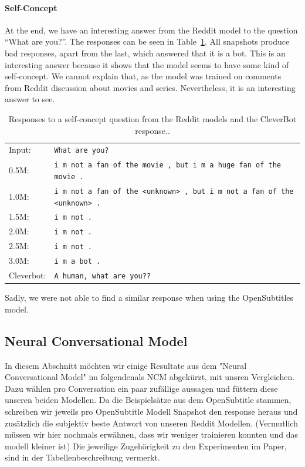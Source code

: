 \paragraph{Self-Concept} At the end, we have an interesting answer from the Reddit model to the question ``What are you?''. The responses can be seen in Table~\ref{results:example7_output:Reddit_compared}. All snapshots produce bad responses, apart from the last, which answered that it is a bot. This is an interesting answer because it shows that the model seems to have some kind of self-concept. We cannot explain that, as the model was trained on comments from Reddit discussion about movies and series. Nevertheless, it is an interesting answer to see.

\begin{table}[H]
	\centering
	\begin{adjustbox}{max width=\textwidth}
		\begin{tabular}{ll}
			\toprule
			Input: 	& \texttt{What are you?}\\
			0.5M: 	& \texttt{i m not a fan of the movie , but i m a huge fan of the movie .}\\
			1.0M: 	& \texttt{i m not a fan of the <unknown> , but i m not a fan of the <unknown> .}\\
			1.5M:	& \texttt{i m not .}\\
			2.0M:	& \texttt{i m not .}\\
			2.5M:	& \texttt{i m not .}\\
			3.0M:	& \texttt{i m a bot .}\\
			Cleverbot:	& \texttt{A human, what are you??}\\
			\bottomrule
		\end{tabular}
	\end{adjustbox}
	\caption{Responses to a self-concept question from the Reddit models and the CleverBot response..}
	\label{results:example7_output:Reddit_compared}
\end{table}

Sadly, we were not able to find a similar response when using the OpenSubtitles model.

\subsection{Neural Conversational Model}
In diesem Abschnitt möchten wir einige Resultate aus dem "Neural Conversational Model" im folgendenals NCM abgekürzt, mit unsren Vergleichen. Dazu wählen pro Conversation ein paar zufällige aussagen und füttern diese unseren beiden Modellen. Da die Beispielsätze aus dem OpenSubtitle stammen, schreiben wir jeweils pro OpenSubtitle Modell Snapshot den response heraus und zusätzlich die subjektiv beste Antwort von unseren Reddit Modellen. (Vermutlich müssen wir hier nochmals erwähnen, dass wir weniger trainieren konnten und das modell kleiner ist)
Die jeweilige Zugehörigkeit zu den Experimenten im Paper, sind in der Tabellenbeschreibung vermerkt.

